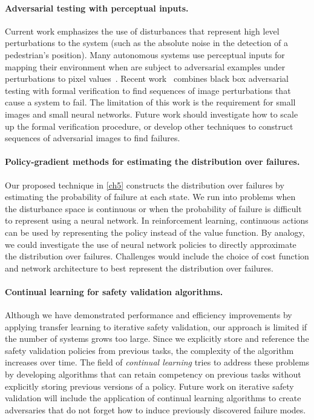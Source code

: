 \paragraph{Adversarial testing with perceptual inputs.} Current work emphasizes the use of disturbances that represent high level perturbations to the system (such as the absolute noise in the detection of a pedestrian's position). Many autonomous systems use perceptual inputs for mapping their environment when are subject to adversarial examples under perturbations to pixel values~\cite{sitawarin2018deceiving}. Recent work~\cite{julian2020validation} combines black box adversarial testing with formal verification to find sequences of image perturbations that cause a system to fail. The limitation of this work is the requirement for small images and small neural networks. Future work should investigate how to scale up the formal verification procedure, or develop other techniques to construct sequences of adversarial images to find failures. 


\paragraph{Policy-gradient methods for estimating the distribution over failures.} Our proposed technique in \cref{ch5} constructs the distribution over failures by estimating the probability of failure at each state. We run into problems when the disturbance space is continuous or when the probability of failure is difficult to represent using a neural network. In reinforcement learning, continuous actions can be used by representing the policy instead of the value function. By analogy, we could investigate the use of neural network policies to directly approximate the distribution over failures. Challenges would include the choice of cost function and network architecture to best represent the distribution over failures. 

\paragraph{Continual learning for safety validation algorithms.} Although we have demonstrated performance and efficiency improvements by applying transfer learning to iterative safety validation, our approach is limited if the number of systems grows too large. Since we explicitly store and reference the safety validation policies from previous tasks, the complexity of the algorithm increases over time. The field of \emph{continual learning} tries to address these problems by developing algorithms that can retain competency on previous tasks without explicitly storing previous versions of a policy. Future work on iterative safety validation will include the application of continual learning algorithms to create adversaries that do not forget how to induce previously discovered failure modes. 